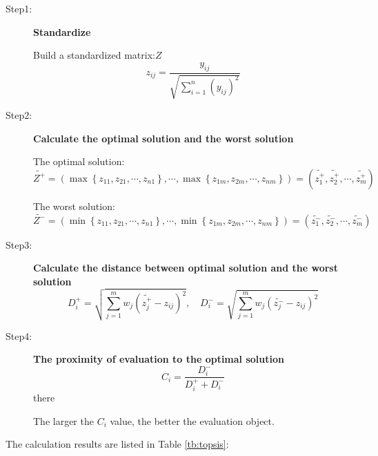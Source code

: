 \documentclass[12pt]{article}
\begin{document}
	\begin{description}
		\item[Step1:] \textbf{Standardize}
		
		Build a standardized matrix:$Z$
		\begin{equation}\label{eq:normalization}
			z_{ij} = \frac{y_{ij}}{\sqrt{\sum_{i=1}^{n}(y_{ij})^2}}
		\end{equation}
		
		\item[Step2:] \textbf{Calculate the optimal solution and the worst solution}
		
		The optimal solution:
		\begin{equation}\label{eq:best}
			\widetilde{Z^{+}}  = \left ( \max \left \{ z_{11},z_{21},\cdots,z_{n1} \right \}, \cdots,\max \left \{ z_{1m},z_{2m},\cdots,z_{nm} \right \}   \right ) = \left ( \widetilde{z^{+}_{1}},\widetilde{z^{+}_{2}},\cdots,\widetilde{z^{+}_{m}} \right )  
		\end{equation}
		
		The worst solution:
		\begin{equation}\label{eq:worsr}
			\widetilde{Z^{-}}  = \left ( \min \left \{ z_{11},z_{21},\cdots,z_{n1} \right \}, \cdots,\min \left \{ z_{1m},z_{2m},\cdots,z_{nm} \right \}   \right ) = \left ( \widetilde{z^{-}_{1}},\widetilde{z^{-}_{2}},\cdots,\widetilde{z^{-}_{m}} \right )  	
		\end{equation}
		
		\item[Step3:] \textbf{Calculate the distance between optimal solution and the worst solution}
		\begin{equation}\label{eq:distance}
			D_{i}^{+} = \sqrt{\sum_{j=1}^{m} w_{j} (\widetilde{z_{j}^{+}} - z_{ij})^2}, \quad D_{i}^{-} = \sqrt{\sum_{j=1}^{m} w_{j} (\widetilde{z_{j}^{-}} - z_{ij})^2}
		\end{equation}
		
		\item[Step4:] \textbf{The proximity of evaluation to the optimal solution}
		\begin{equation}\label{eq:evaluate}
			C_{i} = \frac{D_{i}^{-}}{D_{i}^{+} + D_{i}^{-}}
		\end{equation}
		there
	
		\qquad The larger the $C_{i}$ value, the better the evaluation object.
		
	\end{description}
	The calculation results are listed in Table \ref{tb:topsis}:
	
\end{document}
